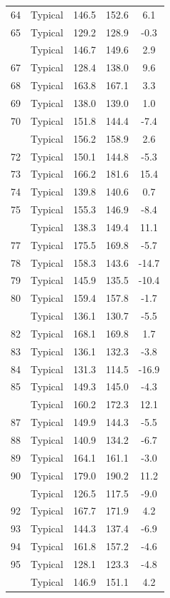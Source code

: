 \documentclass[
]{book}
\begin{document}
\begin{table}[!h]
{\begin{tabular}[t]{ccccc}
64 & Typical & 146.5 & 152.6 & 6.1\\
65 & Typical & 129.2 & 128.9 & -0.3\\
\addlinespace
66 & Typical & 146.7 & 149.6 & 2.9\\
67 & Typical & 128.4 & 138.0 & 9.6\\
68 & Typical & 163.8 & 167.1 & 3.3\\
69 & Typical & 138.0 & 139.0 & 1.0\\
70 & Typical & 151.8 & 144.4 & -7.4\\
\addlinespace
71 & Typical & 156.2 & 158.9 & 2.6\\
72 & Typical & 150.1 & 144.8 & -5.3\\
73 & Typical & 166.2 & 181.6 & 15.4\\
74 & Typical & 139.8 & 140.6 & 0.7\\
75 & Typical & 155.3 & 146.9 & -8.4\\
\addlinespace
76 & Typical & 138.3 & 149.4 & 11.1\\
77 & Typical & 175.5 & 169.8 & -5.7\\
78 & Typical & 158.3 & 143.6 & -14.7\\
79 & Typical & 145.9 & 135.5 & -10.4\\
80 & Typical & 159.4 & 157.8 & -1.7\\
\addlinespace
81 & Typical & 136.1 & 130.7 & -5.5\\
82 & Typical & 168.1 & 169.8 & 1.7\\
83 & Typical & 136.1 & 132.3 & -3.8\\
84 & Typical & 131.3 & 114.5 & -16.9\\
85 & Typical & 149.3 & 145.0 & -4.3\\
\addlinespace
86 & Typical & 160.2 & 172.3 & 12.1\\
87 & Typical & 149.9 & 144.3 & -5.5\\
88 & Typical & 140.9 & 134.2 & -6.7\\
89 & Typical & 164.1 & 161.1 & -3.0\\
90 & Typical & 179.0 & 190.2 & 11.2\\
\addlinespace
91 & Typical & 126.5 & 117.5 & -9.0\\
92 & Typical & 167.7 & 171.9 & 4.2\\
93 & Typical & 144.3 & 137.4 & -6.9\\
94 & Typical & 161.8 & 157.2 & -4.6\\
95 & Typical & 128.1 & 123.3 & -4.8\\
\addlinespace
96 & Typical & 146.9 & 151.1 & 4.2\\

\end{tabular}}
\end{table}
\end{document}
